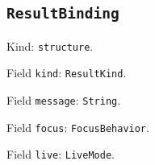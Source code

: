 \documentclass[11pt]{article}
\begin{document}
\subsection*{\texttt{ResultBinding}}
\noindent Kind: \texttt{structure}.\par
\noindent Field \texttt{kind}: \texttt{ResultKind}.\par
\noindent Field \texttt{message}: \texttt{String}.\par
\noindent Field \texttt{focus}: \texttt{FocusBehavior}.\par
\noindent Field \texttt{live}: \texttt{LiveMode}.\par
\end{document}
